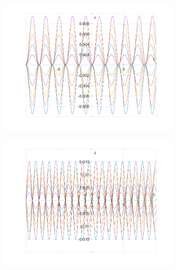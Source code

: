 \documentclass{article}
\begin{document}
	\begin{figure}[h!]
		\centering
		\begin{subfigure}[b]{0.48\linewidth}
			\includegraphics[width=\linewidth]{./SmallOscillations/S6/F3.png}
		\end{subfigure}
		\begin{subfigure}[b]{0.48\linewidth}
			\includegraphics[width=\linewidth]{./SmallOscillations/S6/F4.png}
		\end{subfigure}
	\end{figure}
\end{document}
